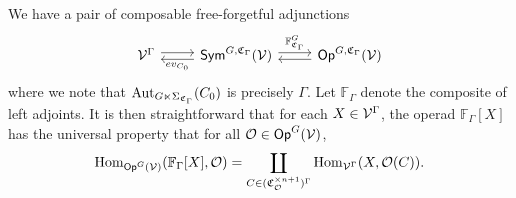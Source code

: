 \documentclass[a4paper,10pt
,draft
]{article}%
\renewcommand{\1}{\eta}%
\begin{document}
We have a pair of composable free-forgetful adjunctions
\[
      \begin{tikzcd}
            \V^\Gamma \arrow[r, shift left]
            &
            \Sym^{G, \mathfrak C_\Gamma}(\V) \arrow[l, shift left, "ev_{C_0}"] \arrow[r, shift left, "\mathbb F^G_{\mathfrak C_\Gamma}"]
            &
            \Op^{G, \mathfrak C_\Gamma}(\V) \arrow[l, shift left]
      \end{tikzcd}
\]
where we note that $\operatorname{Aut}_{G \ltimes \Sigma_{\mathfrak C_\Gamma}}(C_0)$ is precisely $\Gamma$.
Let $\mathbb F_\Gamma$ denote the composite of left adjoints.
It is then straightforward that for each $X \in \mathcal V^\Gamma$,
the operad $\mathbb F_\Gamma[X]$ has the universal property that for all $\mathcal{O} \in \mathsf{Op}^G(\mathcal V)$,
\begin{equation}
      \operatorname{Hom}_{\mathsf{Op}^G(\mathcal V)}(\mathbb F_\Gamma[X], \mathcal{O}) = \mathop\coprod\limits_{C \in (\mathfrak C_{\mathcal{O}}^{\times n+1})^\Gamma}\operatorname{Hom}_{\mathcal V^\Gamma}(X, \mathcal{O}(C)).
\end{equation}
\end{document}
